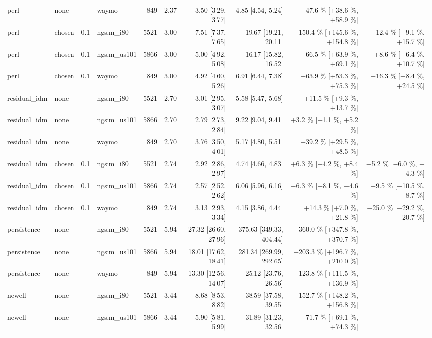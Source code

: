 \begin{table}[htbp]
{\begin{tabular}{llrlrrrrrr}
perl & none &  & waymo & 849 & 2.37 & 3.50 [3.29, 3.77] & 4.85 [4.54, 5.24] & +47.6 \% [+38.6 \%, +58.9 \%] &  \\
perl & chosen & 0.1 & ngsim\_i80 & 5521 & 3.00 & 7.51 [7.37, 7.65] & 19.67 [19.21, 20.11] & +150.4 \% [+145.6 \%, +154.8 \%] & +12.4 \% [+9.1 \%, +15.7 \%] \\
perl & chosen & 0.1 & ngsim\_us101 & 5866 & 3.00 & 5.00 [4.92, 5.08] & 16.17 [15.82, 16.52] & +66.5 \% [+63.9 \%, +69.1 \%] & +8.6 \% [+6.4 \%, +10.7 \%] \\
perl & chosen & 0.1 & waymo & 849 & 3.00 & 4.92 [4.60, 5.26] & 6.91 [6.44, 7.38] & +63.9 \% [+53.3 \%, +75.3 \%] & +16.3 \% [+8.4 \%, +24.5 \%] \\
residual\_idm & none &  & ngsim\_i80 & 5521 & 2.70 & 3.01 [2.95, 3.07] & 5.58 [5.47, 5.68] & +11.5 \% [+9.3 \%, +13.7 \%] &  \\
residual\_idm & none &  & ngsim\_us101 & 5866 & 2.70 & 2.79 [2.73, 2.84] & 9.22 [9.04, 9.41] & +3.2 \% [+1.1 \%, +5.2 \%] &  \\
residual\_idm & none &  & waymo & 849 & 2.70 & 3.76 [3.50, 4.01] & 5.17 [4.80, 5.51] & +39.2 \% [+29.5 \%, +48.5 \%] &  \\
residual\_idm & chosen & 0.1 & ngsim\_i80 & 5521 & 2.74 & 2.92 [2.86, 2.97] & 4.74 [4.66, 4.83] & +6.3 \% [+4.2 \%, +8.4 \%] & $-$5.2 \% [$-$6.0 \%, $-$4.3 \%] \\
residual\_idm & chosen & 0.1 & ngsim\_us101 & 5866 & 2.74 & 2.57 [2.52, 2.62] & 6.06 [5.96, 6.16] & $-$6.3 \% [$-$8.1 \%, $-$4.6 \%] & $-$9.5 \% [$-$10.5 \%, $-$8.7 \%] \\
residual\_idm & chosen & 0.1 & waymo & 849 & 2.74 & 3.13 [2.93, 3.34] & 4.15 [3.86, 4.44] & +14.3 \% [+7.0 \%, +21.8 \%] & $-$25.0 \% [$-$29.2 \%, $-$20.7 \%] \\
persistence & none &  & ngsim\_i80 & 5521 & 5.94 & 27.32 [26.60, 27.96] & 375.63 [349.33, 404.44] & +360.0 \% [+347.8 \%, +370.7 \%] &  \\
persistence & none &  & ngsim\_us101 & 5866 & 5.94 & 18.01 [17.62, 18.41] & 281.34 [269.99, 292.65] & +203.3 \% [+196.7 \%, +210.0 \%] &  \\
persistence & none &  & waymo & 849 & 5.94 & 13.30 [12.56, 14.07] & 25.12 [23.76, 26.56] & +123.8 \% [+111.5 \%, +136.9 \%] &  \\
newell & none &  & ngsim\_i80 & 5521 & 3.44 & 8.68 [8.53, 8.82] & 38.59 [37.58, 39.55] & +152.7 \% [+148.2 \%, +156.8 \%] &  \\
newell & none &  & ngsim\_us101 & 5866 & 3.44 & 5.90 [5.81, 5.99] & 31.89 [31.23, 32.56] & +71.7 \% [+69.1 \%, +74.3 \%] &  \\

\end{tabular}}
\end{table}
